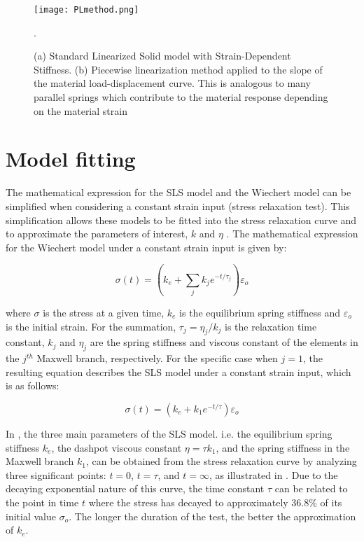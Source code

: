 \begin{figure}[htb!]
	\centering
    \texttt{[image: PLmethod.png]}
    \caption{(a) Standard Linearized Solid model with Strain-Dependent Stiffness. (b) Piecewise linearization method applied to the slope of the material load-displacement curve. This is analogous to many parallel springs which contribute to the material response depending on the material strain \cite{austin2015control}}.
    \label{fig:PLmethod}
\end{figure}

\section{Model fitting} \label{sec:Modelfit}

The mathematical expression for the SLS model and the Wiechert model can be simplified when considering a constant strain input (stress relaxation test). This simplification allows these models to be fitted into the stress relaxation curve and to approximate the parameters of interest, $k$ and $\eta$ \cite{roylance2001engineering}. The mathematical expression for the Wiechert model under a constant strain input is given by:

\begin{equation}
\label{eq1}
\sigma (t) = \left( k_e +  \sum_{j} k_j e^{-t/\tau_j} \right)  \varepsilon_o
\end{equation}

\noindent where $\sigma$ is the stress at a given time, $k_e$ is the equilibrium spring stiffness and $\varepsilon_o$ is the initial strain. For the summation, $\tau_j=\eta_j/k_j$ is the relaxation time constant, $k_j$ and $\eta_j$ are the spring stiffness and viscous constant of the elements in the $j^{th}$ Maxwell branch, respectively. For the specific case when $j = 1$, the resulting equation describes the SLS model under a constant strain input, which is as follows:

\begin{equation}
\label{eq11}
\sigma(t) = \left( k_e +  k_1 e^{-t/\tau} \right)  \varepsilon_o
\end{equation}


In , the three main parameters of the SLS model. i.e. the equilibrium spring stiffness $k_e$, the dashpot viscous constant $\eta = \tau k_1$, and the spring stiffness in the Maxwell branch $k_1$, can be obtained from the stress relaxation curve by analyzing three significant points: $t=0$, $t=\tau$, and $t=\infty$, as illustrated in . Due to the decaying exponential nature of this curve, the time constant $\tau$ can be related to the point in time $t$ where the stress has decayed to approximately 36.8\% of its initial value $\sigma_o$. The longer the duration of the test, the better the approximation of $k_e$.

